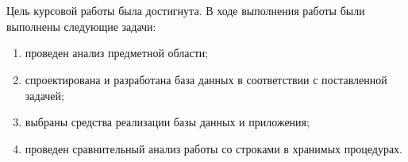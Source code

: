 \chapter*{}


Цель курсовой работы была достигнута.
В ходе выполнения работы были выполнены следующие задачи:
\begin{enumerate}[label=\arabic*)]
	\item проведен анализ предметной области;
	\item спроектирована и разработана база данных в соответствии с поставленной задачей;
	\item выбраны средства реализации базы данных и приложения;
	\item проведен сравнительный анализ работы со строками в хранимых процедурах.
\end{enumerate}
